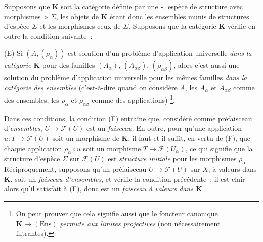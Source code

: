 \begin{env}[3.1.3]
\label{0.3.1.3-fr}
Supposons que $\boldsymbol{K}$ soit la catégorie définie par une «~espèce de
structure avec morphismes~» $\Sigma$, les objets de $\boldsymbol{K}$ étant donc
les ensembles munis de structures d'espèce $\Sigma$ et les morphismes ceux de
$\Sigma$. Supposons que la catégorie $\boldsymbol{K}$ vérifie en outre la
condition suivante~:

\smallskip
\noindent
\textup{(E)} Si $(A,(\rho_\alpha))$ est solution d'un problème d'application
universelle \emph{dans la catégorie $\boldsymbol{K}$} pour des familles
$(A_\alpha)$, $(A_{\alpha\beta})$, $(\rho_{\alpha\beta})$, alors c'est aussi
une solution du problème d'application universelle pour les mêmes familles
\emph{dans la catégorie des ensembles} (c'est-à-dire quand on considère $A$,
les $A_\alpha$ et $A_{\alpha\beta}$ comme des ensembles, les $\rho_\alpha$ et
$\rho_{\alpha\beta}$ comme des applications)%
\footnote{On peut prouver que cela signifie aussi que le foncteur canonique
$\boldsymbol{K}\to(\mathrm{Ens})$ \emph{permute aux limites projectives} (non
nécessairement filtrantes).}.

Dans ces conditions, la condition (F) entraîne que, considéré comme
préfaisceau d'\emph{ensembles}, $U\to\mathcal{F}(U)$ est un \emph{faisceau}.
En outre, pour qu'une application $u:T\to\mathcal{F}(U)$ soit un morphisme de
$\boldsymbol{K}$, il faut et il suffit, en vertu de (F), que chaque application
$\rho_\alpha\circ u$ soit un morphisme $T\to\mathcal{F}(U_\alpha)$, ce qui
signifie que la structure d'espèce $\Sigma$ sur $\mathcal{F}(U)$ est
\emph{structure initiale} pour les morphismes $\rho_\alpha$. Réciproquement,
supposons qu'un préfaisceau $U\to\mathcal{F}(U)$ sur $X$, à valeurs dans
$\boldsymbol{K}$, soit un \emph{faisceau d'ensembles}, et vérifie la condition
précédente~; il est clair alors qu'il satisfait à (F), donc est un
\emph{faisceau à valeurs dans $\boldsymbol{K}$}.
\end{env}

